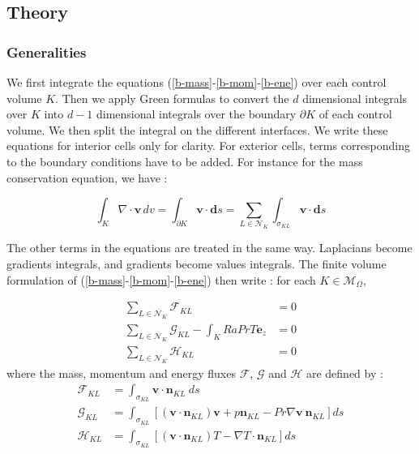 \documentclass[12pt]{article}
\newcommand{\vb}[1]{\ensuremath{\boldsymbol #1}}
\begin{document}
\subsection{Theory}
\subsubsection{Generalities}
We first integrate the equations
(\ref{b-mass}-\ref{b-mom}-\ref{b-ene}) over each control volume
$K$. Then we apply Green formulas to convert the $d$ dimensional
integrals over $K$ into $d-1$ dimensional integrals over the boundary
$\partial K$ of each control volume. We then split the integral on the
different interfaces. We write these equations for interior cells only
for clarity. For exterior cells, terms corresponding to the boundary
conditions have to be added. For instance for the mass conservation
equation, we have :

\begin{equation}
  \int_K \nabla \cdot \vb{v} \, dv = \int_{\partial K} \vb v \cdot \vb{ds} =
  \sum_{L \in \mathcal{N}_K} \int_{\sigma_{KL}} \vb{v} \cdot \vb{ds}
\end{equation}

The other terms in the equations are treated in the same
way. Laplacians become gradients integrals, and gradients become values
integrals. The finite volume formulation of
(\ref{b-mass}-\ref{b-mom}-\ref{b-ene}) then write : for each $K \in
\mathcal M_\Omega$,

\begin{align}
  \sum_{L \in \mathcal{N}_K} \mathcal{F}_{KL} &= 0\\
  \sum_{L \in \mathcal{N}_K} \mathcal{G}_{KL} - \int_{K} Ra Pr T
  \vb{e_{z}} &= 0 \\
  \sum_{L \in \mathcal{N}_K} \mathcal{H}_{KL} &= 0
\end{align}
where the mass, momentum and energy fluxes $\mathcal{F}$,
$\mathcal{G}$ and $\mathcal{H}$ are defined by :
\begin{align}
  \mathcal{F}_{KL} &= \int_{\sigma_{KL}} \vb{v} \cdot \vb{n}_{KL} \ ds \\
  \mathcal{G}_{KL} &= \int_{\sigma_{KL}} \left[
    (\vb{v} \cdot \vb{n}_{KL}) \vb{v} +
    p \vb{n}_{KL} -
    Pr \nabla \vb{v} \ \vb{n}_{KL}
  \right] ds \\
  \mathcal{H}_{KL} &= \int_{\sigma_{KL}} \left[
    (\vb v \cdot \vb{n}_{KL}) T -
    \nabla T \cdot \vb{n}_{KL}
    \right] ds
\end{align}
\end{document}
